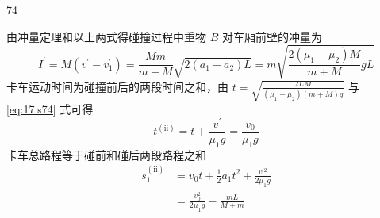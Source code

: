 \begin{solution}{74}
\begin{subsolution}
\begin{subsubsolution}
            由冲量定理和以上两式得碰撞过程中重物 $B$ 对车厢前壁的冲量为
            \begin{equation}
                I^{\prime} = M (v^{\prime} - v_{1}^{\prime}) = \frac{M m}{m + M} \sqrt{2 (a_{1} - a_{2}) L} = m \sqrt{\frac{2 (\mu_{1} - \mu_{2}) M}{m + M} g L}
                \label{eq:18.s74}
            \end{equation}
            卡车运动时间为碰撞前后的两段时间之和，由 $t = \sqrt{\frac{2LM}{(\mu_1 - \mu_2)(m + M)g}}$ 与 \eqref{eq:17.s74} 式可得
            \begin{equation}
                t^{\mathrm{(ii)}} = t + \frac{v^{\prime}}{\mu_{1} g} = \frac{v_{0}}{\mu_{1} g}
                \label{eq:19.s74}
            \end{equation}
            卡车总路程等于碰前和碰后两段路程之和
            \begin{align}
                s_{1}^{\mathrm{(ii)}} &= v_{0} t + \frac{1}{2} a_{1} t^{2} + \frac{v^{\prime 2}}{2 \mu_{1} g} \nonumber \\
                &= \frac{v_{0}^{2}}{2 \mu_{1} g} - \frac{m L}{M + m}
                \label{eq:20.s74}
            \end{align}
        \end{subsubsolution}
    \end{subsolution}
\end{solution}